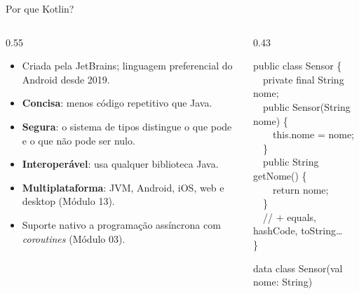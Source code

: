 \documentclass[aspectratio=169,10pt]{beamer}
\begin{document}
\begin{frame}{Por que Kotlin?}
  \begin{columns}[T]
    \begin{column}{0.55\textwidth}
      \begin{itemize}
        \item Criada pela JetBrains; linguagem preferencial do Android desde 2019.
        \item \textbf{Concisa}: menos código repetitivo que Java.
        \item \textbf{Segura}: o sistema de tipos distingue o que pode e o que não pode ser nulo.
        \item \textbf{Interoperável}: usa qualquer biblioteca Java.
        \item \textbf{Multiplataforma}: JVM, Android, iOS, web e desktop (Módulo 13).
        \item Suporte nativo a programação assíncrona com \emph{coroutines} (Módulo 03).
      \end{itemize}
    \end{column}
    \begin{column}{0.43\textwidth}
      \begin{exemplo}[Java]
        \ttfamily\scriptsize
        public class Sensor \{\\
        \ \ private final String nome;\\
        \ \ public Sensor(String nome) \{\\
        \ \ \ \ this.nome = nome;\\
        \ \ \}\\
        \ \ public String getNome() \{\\
        \ \ \ \ return nome;\\
        \ \ \}\\
        \ \ // + equals, hashCode, toString\ldots\\
        \}
      \end{exemplo}
      \begin{exemplo}[Kotlin]
        \ttfamily\scriptsize data class Sensor(val nome: String)
      \end{exemplo}
    \end{column}
  \end{columns}
\end{frame}
\end{document}
